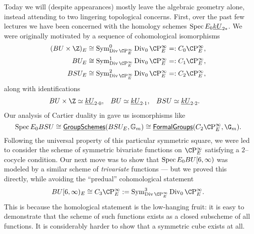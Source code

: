 Today we will (despite appearances) mostly leave the algebraic geometry alone, instead attending to two lingering topological concerns.  First, over the past few lectures we have been concerned with the homology schemes $\operatorname{Spec} E_0 \underline{\smash{kU}}_{2*}$.  We were originally motivated by a sequence of cohomological isomorphisms
\begin{align*}
(BU \times \Z)_E & \cong \Sym^0_{\Div \CP^\infty_E} \Div_0 \CP^\infty_E =: C_0 \CP^\infty_E, \\
BU_E & \cong \Sym^1_{\Div \CP^\infty_E} \Div_0 \CP^\infty_E =: C_1 \CP^\infty_E, \\
BSU_E & \cong \Sym^2_{\Div \CP^\infty_E} \Div_0 \CP^\infty_E =: C_2 \CP^\infty_E,
\end{align*}
along with identifications
\begin{align*}
BU \times \Z & \simeq \OS{kU}{2 \cdot 0}, &
BU & \simeq \OS{kU}{2 \cdot 1}, &
BSU & \simeq \OS{kU}{2 \cdot 2}.
\end{align*}
Our analysis of Cartier duality in  gave us isomorphisms like \[\Spec E_0 BSU \cong \InternalHom{GroupSchemes}(BSU_E, \Gm) \cong \InternalHom{FormalGroups}(C_2 \CP^\infty_E, \G_m).\] Following the universal property of this particular symmetric square, we were led to consider the scheme of symmetric bivariate functions on $\CP^\infty_E$ satisfying a $2$--cocycle condition.  Our next move was to show that $\operatorname{Spec} E_0 BU[6, \infty)$ was modeled by a similar scheme of \emph{trivariate} functions --- but we proved this directly, while avoiding the ``predual'' cohomological statement \[BU[6, \infty)_E \cong C_3 \CP^\infty_E := \Sym^3_{\Div \CP^\infty_E} \Div_0 \CP^\infty_E.\]  This is because the homological statement is the low-hanging fruit: it is easy to demonstrate that the scheme of such functions exists as a closed subscheme of all functions.  It is considerably harder to show that a symmetric cube exists at all.

